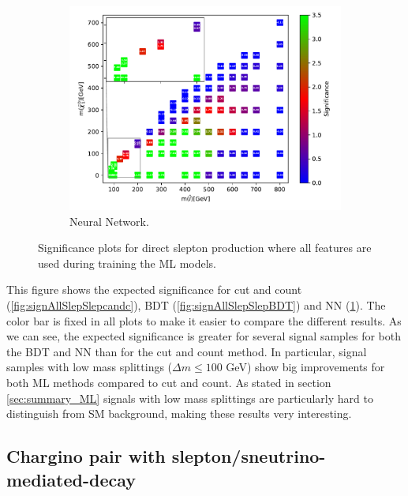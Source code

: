 \begin{figure}[H]
    \begin{subfigure}[t!]{0.49\textwidth}
    \includegraphics[width = \textwidth]{Figures/Significances/significance_NN_slepslep_All_level.pdf}
    \caption{Neural Network.}
        \label{fig:signAllSlepSlepNN}
    \end{subfigure}
    \caption{Significance plots for direct slepton production where all features are used during training the ML models.}
    \label{fig:signAllSlepSlep}
\end{figure}

This figure shows the expected significance for cut and count (\ref{fig:signAllSlepSlepcandc}), BDT (\ref{fig:signAllSlepSlepBDT}) and NN (\ref{fig:signAllSlepSlepNN}). The color bar is fixed in all plots to make it easier to compare the different results. As we can see, the expected significance is greater for several signal samples for both the BDT and NN than for the cut and count method. In particular, signal samples with low mass splittings ($\Delta m \leq 100$ GeV) show big improvements for both ML methods compared to cut and count. As stated in section \ref{sec:summary_ML} signals with low mass splittings are particularly hard to distinguish from SM background, making these results very interesting.












\subsection{Chargino pair with slepton/sneutrino-mediated-decay}
\label{sec:resC1C1_SlepSnu}

